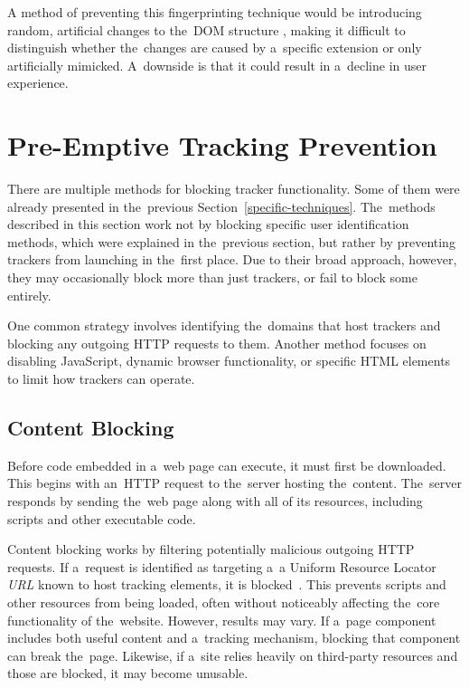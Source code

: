 A method of preventing this fingerprinting technique would be introducing random, artificial changes to the~DOM structure \cite{dom-fingerprinting}, making it difficult to distinguish whether the~changes are caused by a~specific extension or only artificially mimicked. A~downside is that it could result in a~decline in user experience.


\section{Pre-Emptive Tracking Prevention}
\label{broad-techniques}
There are multiple methods for blocking tracker functionality. Some of them were already presented in the~previous Section~\ref{specific-techniques}. The~methods described in this section work not by blocking specific user identification methods, which were explained in the~previous section, but rather by preventing trackers from launching in the~first place. Due to their broad approach, however, they may occasionally block more than just trackers, or fail to block some entirely.

One common strategy involves identifying the~domains that host trackers and blocking any outgoing HTTP requests to them. Another method focuses on disabling JavaScript, dynamic browser functionality, or specific HTML elements to limit how trackers can operate.


\subsection{Content Blocking}
\label{domain-blocking}
Before code embedded in a~web page can execute, it must first be downloaded. This begins with an~HTTP request to the~server hosting the~content. The~server responds by sending the~web page along with all of its resources, including scripts and other executable code.

Content blocking works by filtering potentially malicious outgoing HTTP requests. If a~request is identified as targeting a~a Uniform Resource Locator \textit{URL} known to host tracking elements, it is blocked~\cite{domain-blocking}. This prevents scripts and other resources from being loaded, often without noticeably affecting the~core functionality of the~website. However, results may vary. If a~page component includes both useful content and a~tracking mechanism, blocking that component can break the~page. Likewise, if a~site relies heavily on third-party resources and those are blocked, it may become unusable.

